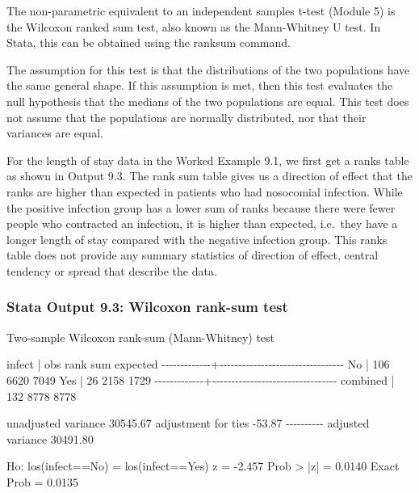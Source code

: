 \documentclass[
]{memoir}
\newenvironment{Shaded}{\begin{snugshade}}{\end{snugshade}}
\newcommand{\NormalTok}[1]{#1}
\begin{document}
The non-parametric equivalent to an independent samples t-test (Module 5) is the Wilcoxon ranked sum test, also known as the Mann-Whitney U test. In Stata, this can be obtained using the ranksum command.

The assumption for this test is that the distributions of the two populations have the same general shape. If this assumption is met, then this test evaluates the null hypothesis that the medians of the two populations are equal. This test does not assume that the populations are normally distributed, nor that their variances are equal.

For the length of stay data in the Worked Example 9.1, we first get a ranks table as shown in Output 9.3. The rank sum table gives us a direction of effect that the ranks are higher than expected in patients who had nosocomial infection. While the positive infection group has a lower sum of ranks because there were fewer people who contracted an infection, it is higher than expected, i.e.~they have a longer length of stay compared with the negative infection group. This ranks table does not provide any summary statistics of direction of effect, central tendency or spread that describe the data.

\hypertarget{stata-output-9.3-wilcoxon-rank-sum-test}{%
\subsubsection*{Stata Output 9.3: Wilcoxon rank-sum test}\label{stata-output-9.3-wilcoxon-rank-sum-test}}

\begin{Shaded}
\begin{Highlighting}[]
\NormalTok{Two{-}sample Wilcoxon rank{-}sum (Mann{-}Whitney) test}

\NormalTok{      infect |      obs    rank sum    expected}
\NormalTok{{-}{-}{-}{-}{-}{-}{-}{-}{-}{-}{-}{-}{-}+{-}{-}{-}{-}{-}{-}{-}{-}{-}{-}{-}{-}{-}{-}{-}{-}{-}{-}{-}{-}{-}{-}{-}{-}{-}{-}{-}{-}{-}{-}{-}{-}{-}}
\NormalTok{          No |      106        6620        7049}
\NormalTok{         Yes |       26        2158        1729}
\NormalTok{{-}{-}{-}{-}{-}{-}{-}{-}{-}{-}{-}{-}{-}+{-}{-}{-}{-}{-}{-}{-}{-}{-}{-}{-}{-}{-}{-}{-}{-}{-}{-}{-}{-}{-}{-}{-}{-}{-}{-}{-}{-}{-}{-}{-}{-}{-}}
\NormalTok{    combined |      132        8778        8778}

\NormalTok{unadjusted variance    30545.67}
\NormalTok{adjustment for ties      {-}53.87}
\NormalTok{                     {-}{-}{-}{-}{-}{-}{-}{-}{-}{-}}
\NormalTok{adjusted variance      30491.80}

\NormalTok{Ho: los(infect==No) = los(infect==Yes)}
\NormalTok{             z =  {-}2.457}
\NormalTok{    Prob \textgreater{} |z| =   0.0140}
\NormalTok{    Exact Prob =   0.0135}
\end{Highlighting}
\end{Shaded}
\end{document}
